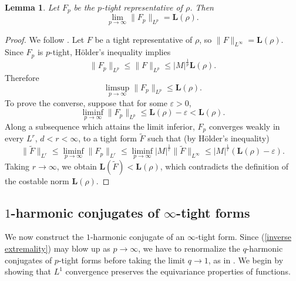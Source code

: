 \documentclass[reqno,11pt]{amsart}
\newcommand{\Comass}{\mathbf L}
\newtheorem{lemma}[theorem]{Lemma}
\theoremstyle{definition}
\numberwithin{equation}{section}
\begin{document}
\begin{lemma}\label{p tights approximate L}
Let $F_p$ be the $p$-tight representative of $\rho$. Then 
$$\lim_{p \to \infty} \|F_p\|_{L^p} = \Comass(\rho).$$
\end{lemma}
\begin{proof}
We follow \cite[Lemma 2.7]{daskalopoulos2020transverse}.
Let $F$ be a tight representative of $\rho$, so $\|F\|_{L^\infty} = \Comass(\rho)$.
Since $F_p$ is $p$-tight, H\"older's inequality implies 
$$\|F_p\|_{L^p} \leq \|F\|_{L^p} \leq |M|^{\frac{1}{p}} \Comass(\rho).$$
Therefore 
$$\limsup_{p \to \infty} \|F_p\|_{L^p} \leq \Comass(\rho).$$
To prove the converse, suppose that for some $\varepsilon > 0$,
$$\liminf_{p \to \infty} \|F_p\|_{L^p} \leq \Comass(\rho) - \varepsilon < \Comass(\rho).$$
Along a subsequence which attains the limit inferior, $F_p$ converges weakly in every $L^r$, $d < r < \infty$, to a tight form $\tilde F$ such that (by H\"older's inequality)
$$\|\tilde F\|_{L^r} \leq \liminf_{p \to \infty} \|F_p\|_{L^r} \leq \liminf_{p \to \infty} |M|^{\frac{1}{r}} \|\tilde F\|_{L^\infty} \leq |M|^{\frac{1}{r}} (\Comass(\rho) - \varepsilon).$$
Taking $r \to \infty$, we obtain $\Comass(\tilde F) < \Comass(\rho)$, which contradicts the definition of the costable norm $\Comass(\rho)$.
\end{proof}


\subsection{\texorpdfstring{$1$-harmonic conjugates of $\infty$-tight forms}{One-harmonic conjugates of infinity-tight forms}}
We now construct the $1$-harmonic conjugate of an $\infty$-tight form.
Since (\ref{inverse extremality}) may blow up as $p \to \infty$, we have to renormalize the $q$-harmonic conjugates of $p$-tight forms before taking the limit $q \to 1$, as in \cite[\S3.2]{daskalopoulos2020transverse}.
We begin by showing that $L^1$ convergence preserves the equivariance properties of functions.
\end{document}
